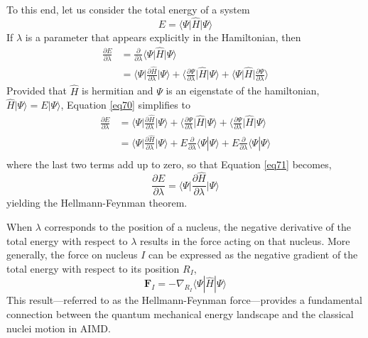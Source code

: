 To this end, let us consider the total energy of a system 
\begin{equation}
	\label{69}
	E = \langle \Psi \big| \hat{H} \big| \Psi \rangle
\end{equation}
If $\lambda$ is a parameter that appears explicitly in the Hamiltonian, then 
\begin{equation}
	\label{eq70}
\begin{aligned}
	\frac{\partial E}{\partial \lambda} &= \frac{\partial}{\partial \lambda} \langle \Psi \big| \hat{H} \big| \Psi \rangle \\
  &= \bigg\langle \Psi \bigg| \frac{\partial \hat{H}}{\partial \lambda} \bigg| \Psi \bigg\rangle + \bigg\langle \frac{\partial \Psi}{\partial \lambda} \bigg| \hat{H} \bigg| \Psi \bigg\rangle +  \bigg\langle \Psi \bigg| \hat{H} \bigg|  \frac{\partial \Psi}{\partial \lambda}  \bigg\rangle
\end{aligned}
\end{equation}
Provided that $\hat{H}$ is hermitian and $\Psi$ is an eigenstate of the hamiltonian, $\hat{H}|\Psi\rangle = E|\Psi\rangle$,
Equation \ref{eq70} simplifies to
\begin{equation}
    \label{eq71}
    \begin{aligned}
        \frac{\partial E}{\partial \lambda} &= 
    \bigg\langle \Psi \bigg| \frac{\partial \hat{H}}{\partial \lambda} \bigg| \Psi \bigg\rangle + 
    \bigg\langle \frac{\partial \Psi}{\partial \lambda}\bigg| \hat{H} \bigg| \Psi \bigg\rangle +  
    \bigg\langle\frac{\partial \Psi}{\partial \lambda}\bigg|\hat{H}\bigg|\Psi \bigg\rangle \\
    &=\bigg\langle \Psi \bigg| \frac{\partial \hat{H}}{\partial \lambda}
        \bigg| \Psi \bigg\rangle + E\frac{\partial}{\partial \lambda}
        \langle \Psi|\Psi \rangle + E\frac{\partial}{\partial \lambda}
        \langle \Psi|\Psi \rangle \\
    \end{aligned}
\end{equation}
where the last two terms add up to zero, so that Equation \ref{eq71} becomes,
\begin{equation}
    \label{eq72}
    \frac{\partial E}{\partial \lambda} = 
    \bigg\langle \Psi \bigg| \frac{\partial \hat{H}}{\partial \lambda} \bigg| \Psi \bigg\rangle 
\end{equation}
yielding the Hellmann-Feynman theorem. 

When $\lambda$ corresponds to the position of a nucleus, the negative 
derivative of the total energy with respect to $\lambda$ results 
in the force acting on that nucleus.  More 
generally, the force on nucleus $I$ can be expressed as 
the negative gradient of the total energy with respect to its position $R_I$,
\begin{equation}
    \label{eq73}
    \mathbf{F}_I = -\nabla_{R_I} \langle \Psi | \hat{H} | \Psi \rangle
\end{equation}
This result---referred to as the Hellmann-Feynman force---provides a 
fundamental connection between the quantum mechanical energy landscape and the 
classical nuclei motion in AIMD. 

